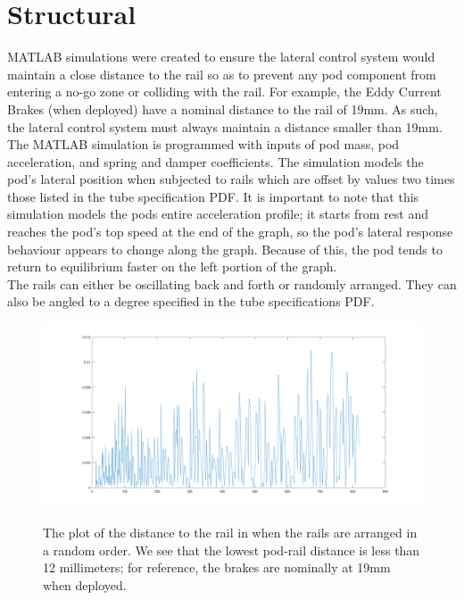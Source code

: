 \documentclass[main.tex]{subfiles}
\begin{document}
    \section{Structural}
    MATLAB simulations were created to ensure the lateral control system would maintain a close distance to the rail so as to prevent any pod component from entering a no-go zone or colliding with the rail. For example, the Eddy Current Brakes (when deployed) have a nominal distance to the rail of 19mm. As such, the lateral control system must always maintain a distance smaller than 19mm.\\
    The MATLAB simulation is programmed with inputs of pod mass, pod acceleration, and spring and damper coefficients. The simulation models the pod's lateral position when subjected to rails which are offset by values two times those listed in the tube specification PDF. It is important to note that this simulation models the pods entire acceleration profile; it starts from rest and reaches the pod's top speed at the end of the graph, so the pod's lateral response behaviour appears to change along the graph. Because of this, the pod tends to return to equilibrium faster on the left portion of the graph. \\
    The rails can either be oscillating back and forth or randomly arranged. They can also be angled to a degree specified in the tube specifications PDF. 
     \begin{figure}[H]
    	\centering
        \includegraphics[width=\linewidth]{images/RandDistToRail}
        \label{fig:RandDistToRail}
        \caption{The plot of the distance to the rail in when the rails are arranged in a random order. We see that the lowest pod-rail distance is less than 12 millimeters; for reference, the brakes are nominally at 19mm when deployed.}
    \end{figure}
\end{document}
